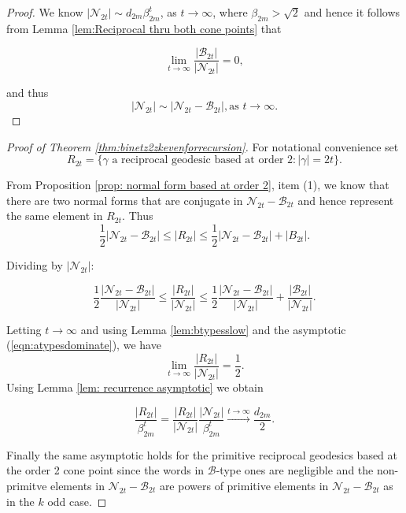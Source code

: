 \documentclass[11pt]{amsart}
\numberwithin{equation}{section}
\theoremstyle{plain}
\begin{document}
\begin{proof}
We know  $|\mathcal{N}_{2t}|\sim d_{2m}\beta_{2m}^t$, as $t\to\infty$, where $\beta_{2m} > \sqrt{2}$ and hence it follows from Lemma \ref{lem:Reciprocal thru both cone points}
that 

\[\displaystyle\lim_{t\to\infty}\dfrac{|\mathcal{B}_{2t}|}{|\mathcal{N}_{2t}|}=0,\]

and thus
\begin{equation}
|\mathcal{N}_{2t}|\sim |\mathcal{N}_{2t}-\mathcal{B}_{2t}|, \textrm{as}\,\,t\to\infty.\end{equation}
\end{proof}



\begin{proof}[Proof of Theorem \ref{thm:binetz2zkevenforrecursion}]
For notational convenience
set 
$$
R_{2t}
=\{\gamma \text{ a reciprocal geodesic based at order } 2: |\gamma|=2t \}.
$$

From Proposition \ref{prop: normal form based at order 2},  item (1), we know that there are two   normal forms that are conjugate  in 
$\mathcal{N}_{2t}-\mathcal{B}_{2t}$ and hence represent the same element in $R_{2t}$.
Thus
\begin{equation}\label{eqn:conjclass}
\frac{1}{2}|\mathcal{N}_{2t}-\mathcal{B}_{2t}| \leq |R_{2t}| \leq \frac{1}{2}|\mathcal{N}_{2t}-\mathcal{B}_{2t}|+|B_{2t}|.\end{equation}


Dividing  by $|\mathcal{N}_{2t}|$:

\[\frac{1}{2}\frac{|\mathcal{N}_{2t}-\mathcal{B}_{2t}|}{|\mathcal{N}_{2t}|}\leq
\frac{|R_{2t}|}{|\mathcal{N}_{2t}|}\leq \frac{1}{2}\frac{|\mathcal{N}_{2t}-\mathcal{B}_{2t}|}{|\mathcal{N}_{2t}|}+\frac{|\mathcal{B}_{2t}|}{|\mathcal{N}_{2t}|}.\]

Letting  $t\to\infty$ and using Lemma  \ref{lem:btypesslow} and the asymptotic (\ref{eqn:atypesdominate}), we have \[\displaystyle\lim_{t\to\infty}\frac{|R_{2t}|}{|\mathcal{N}_{2t}|}=\frac{1}{2}.\]
Using  Lemma
\ref{lem: recurrence asymptotic} we obtain

 \begin{equation}
\frac{|R_{2t}|}{\beta_{2m}^{t}}=\frac{|R_{2t}|}{|\mathcal{N}_{2t}|}
\frac{|\mathcal{N}_{2t}|}{\beta_{2m}^{t}}
\xrightarrow{t\to\infty} \frac{d_{2m}}{2}.
\end{equation}

Finally the same asymptotic  holds for the primitive reciprocal geodesics based at the order 2 cone point since the 
words in $\mathcal{B}$-type ones are negligible and the non-primitve  elements in $\mathcal{N}_{2t}-\mathcal{B}_{2t}$ are powers of primitive elements in $\mathcal{N}_{2t}-\mathcal{B}_{2t}$ as in the $k$ odd case.
\end{proof}
\end{document}
